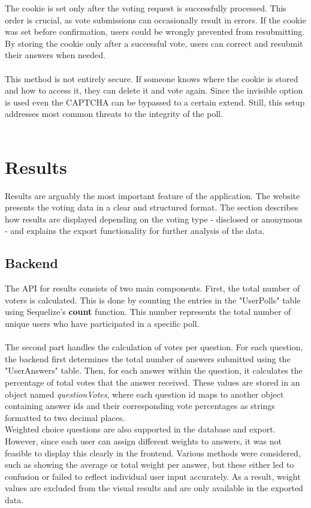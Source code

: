 \documentclass[a4paper,12pt]{report}
\begin{document}
The cookie is set only after the voting request is successfully processed. This order is crucial, as vote submissions can occasionally result in errors. If the cookie was set before confirmation, users could be wrongly prevented from resubmitting. By storing the cookie only after a successful vote, users can correct and resubmit their answers when needed.\\ \\
This method is not entirely secure. If someone knows where the cookie is stored and how to access it, they can delete it and vote again. Since the invisible option is used even the CAPTCHA can be bypassed to a certain extend. Still, this setup addresses most common threats to the integrity of the poll. \\ \\
\section{Results}
Results are arguably the most important feature of the application. The website presents the voting data in a clear and structured format. The section describes how results are displayed depending on the voting type - disclosed or anonymous - and explains the export functionality for further analysis of the data. \\

\subsection{Backend}
The API for results consists of two main components. First, the total number of voters is calculated. This is done by counting the entries in the "UserPolls" table using Sequelize's \textbf{count} function. This number represents the total number of unique users who have participated in a specific poll. \\ \\
The second part handles the calculation of votes per question. For each question, the backend first determines the total number of answers submitted using the "UserAnswers" table. Then, for each answer within the question, it calculates the percentage of total votes that the answer received. These values are stored in an object named \textit{questionVotes}, where each question id maps to another object containing answer ids and their corresponding vote percentages as strings formatted to two decimal places. \\
Weighted choice questions are also supported in the database and export. However, since each user can assign different weights to answers, it was not feasible to display this clearly in the frontend. Various methods were considered, such as showing the average or total weight per answer, but these either led to confusion or failed to reflect individual user input accurately. As a result, weight values are excluded from the visual results and are only available in the exported data. 
\end{document}
